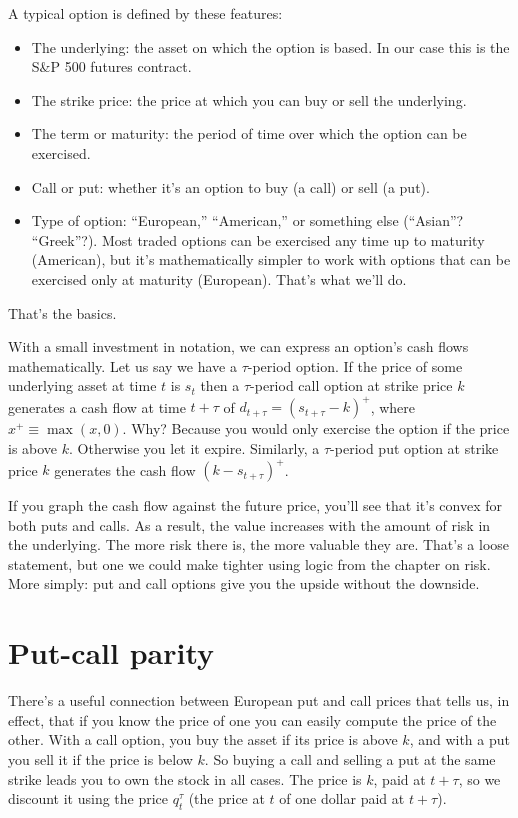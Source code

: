 \documentclass[11pt]{article}
\begin{document}
A typical option is defined by these features:
\begin{itemize}
\item The underlying:  the asset on which the option is based.
In our case this is the S\&P 500 futures contract.
\item The strike price: the price at which you can buy or sell
the underlying.
\item The term or maturity: the period of time
over which the option can be exercised.
\item Call or put:  whether it's an option to buy (a call) or sell (a put).
\item Type of option:  ``European,'' ``American,'' or something else (``Asian''?  ``Greek''?).
Most traded options can be exercised any time up to maturity (American),
but it's mathematically simpler to work with options that can be
exercised only at maturity (European).
That's what we'll do.
\end{itemize}
That's the basics.

With a small investment in notation,
we can express an option's cash flows mathematically.
Let us say we have a $\tau$-period option.
If the price of some underlying asset at time $t$ is $s_t$
then a $\tau$-period call option at strike price $k$
generates a cash flow at time $t+\tau$ of
$ d_{t + \tau} = ( s_{t+\tau} - k )^+ $,
where $x^+ \equiv \max(x,0) $.
Why?  Because you would only exercise the option if the price is above $k$.
Otherwise you let it expire.
Similarly, a $\tau$-period put option at strike price $k$
generates the cash flow $ (k - s_{t+\tau} )^+ $.

If you graph the cash flow against the future price, you'll see
that it's convex for both puts and calls.
As a result, the value increases with the amount
of risk in the underlying.
The more risk there is, the more valuable they are.
That's a loose statement, but one we could make tighter using  logic
from the chapter on risk.  
More simply:  put and call options give you the upside
without the downside.


\section{Put-call parity}


There's a useful connection between European put and call prices
that tells us, in effect, that if you know the price of one you can
easily compute the price of the other.
With a call option, you buy the asset if its price is above $k$,
and with a put you sell it if the price is below $k$.
So buying a call and selling a put at the same strike leads you to own the stock in all cases.
The price is $k$, paid at $t+\tau$, so we discount it using
the price $q^\tau_t$ (the price at $t$ of one dollar paid at $t+\tau$).
\end{document}
